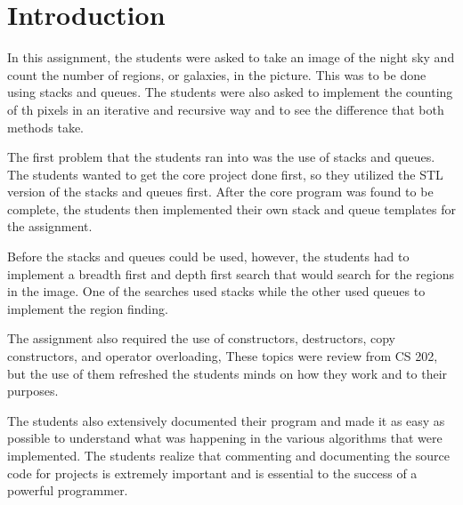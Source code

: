 \documentclass[pdftex, 11pt]{article}
\begin{document}


\pagestyle{fancy}
\renewcommand{\sectionmark}[1]{\markright{\thesection}}
\lhead{}
\cfoot{}
\renewcommand{\footrulewidth}{0.4pt}

\tableofcontents

\listoffigures
\newpage

\cfoot{}
\renewcommand{\footrulewidth}{0.4pt}

\section{Introduction}

In this assignment, the students were asked to take an image of the night sky and count the number of regions, or
galaxies, in the picture. This was to be done using stacks and queues. The students were also asked to implement the
counting of th pixels in an iterative and recursive way and to see the difference that both methods take.

The first problem that the students ran into was the use of stacks and queues. The students wanted to get the core
project done first, so they utilized the STL version of the stacks and queues first. After the core program was found to
be complete, the students then implemented their own stack and queue templates for the assignment.

Before the stacks and queues could be used, however, the students had to implement a breadth first and depth first
search that would search for the regions in the image. One of the searches used stacks while the other used queues to
implement the region finding. 

The assignment also required the use of constructors, destructors, copy constructors, and operator overloading, These
topics were review from CS 202, but the use of them refreshed the students minds on how they work and to their purposes.

The students also extensively documented their program and made it as easy as possible to understand what was happening
in the various algorithms that were implemented. The students realize that commenting and documenting the source code
for projects is extremely important and is essential to the success of a powerful programmer.
\end{document}
